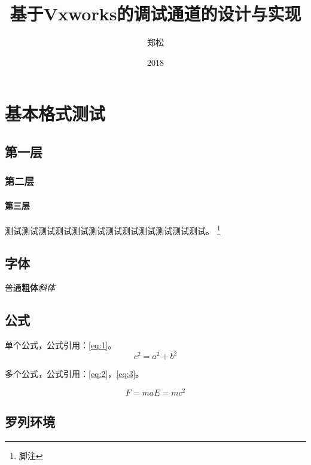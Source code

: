 \documentclass[format=final,language=chinese,degree=bachelor]{hustthesis}
\title{基于Vxworks的调试通道的设计与实现}{A design and implementation of debug channel based on Vxworks.}
\author{郑松}{Joe}
\date{2018}{3}{26}
\begin{document}
\frontmatter
\maketitle
\makeabstract
\tableofcontents
\listoffigures
\listoftables
\mainmatter

\chapter{基本格式测试}\label{chapter:1}

\section{第一层}\label{sec:1}
\subsection{第二层}\label{sec:2}
\subsubsection{第三层}\label{sec:3}
测试测试测试测试测试测试测试测试测试测试测试测试。
\footnote{\label{footnote:1}脚注}

\section{字体}

普通\textbf{粗体}\emph{斜体}


\section{公式}

单个公式，公式引用：\autoref{eq:1}。
\begin{equation}
 c^2 = a^2 + b^2 \label{eq:1}
\end{equation}

多个公式，公式引用：\autoref{eq:2}，\autoref{eq:3}。

\begin{subequations}
\begin{equation}
  F = ma \label{eq:2}
\end{equation}
\begin{equation}
  E = mc^2 \label{eq:3}
\end{equation}
\end{subequations}

\section{罗列环境}
\end{document}
